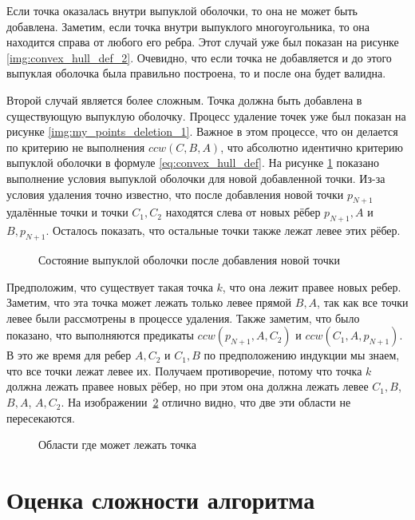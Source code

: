 Если точка оказалась внутри выпуклой оболочки, то она не может быть добавлена. Заметим, если точка внутри выпуклого многоугольника, то она находится справа от любого его ребра. Этот случай уже был показан на рисунке \ref{img:convex_hull_def_2}. Очевидно, что если точка не добавляется и до этого выпуклая оболочка была правильно построена, то и после она будет валидна.

Второй случай является более сложным. Точка должна быть добавлена в существующую выпуклую оболочку. Процесс удаление точек уже был показан на рисунке \ref{img:my_points_deletion_1}. Важное в этом процессе, что он делается по критерию не выполнения $ccw(C, B, A)$, что абсолютно идентично критерию выпуклой оболочки в формуле \ref{eq:convex_hull_def}. На рисунке \ref{img:my_proof_1} показано выполнение условия выпуклой оболочки для новой добавленной точки. Из-за условия удаления точно известно, что после добавления новой точки $p_{N+1}$ удалённые точки и точки $C_1, C_2$ находятся слева от новых рёбер $p_{N+1}, A$ и $B, p_{N+1}$. Осталось показать, что остальные точки также лежат левее этих рёбер.

\begin{figure}
	\centering
	
	\caption{Состояние выпуклой оболочки после добавления новой точки}
	\label{img:my_proof_1}
\end{figure}

Предположим, что существует такая точка $k$, что она лежит правее новых ребер. Заметим, что эта точка может лежать только левее прямой $B, A$, так как все точки левее были рассмотрены в процессе удаления. Также заметим, что было показано, что выполняются предикаты $ccw(p_{N+1}, A, C_2)$ и $ccw(C_1, A, p_{N+1})$. В это же время для ребер $A, C_2$ и $C_1, B$ по предположению индукции мы знаем, что все точки лежат левее их. Получаем противоречие, потому что точка $k$ должна лежать правее новых рёбер, но при этом она должна лежать левее $C_1, B$, $B, A$, $A, C_2$. На изображении~\ref{img:my_proof_2} отлично видно, что две эти области не пересекаются.

\begin{figure}
	\centering
	
	\caption{Области где может лежать точка}
	\label{img:my_proof_2}
\end{figure}

\section{Оценка сложности алгоритма} \label{subsect2_4}

